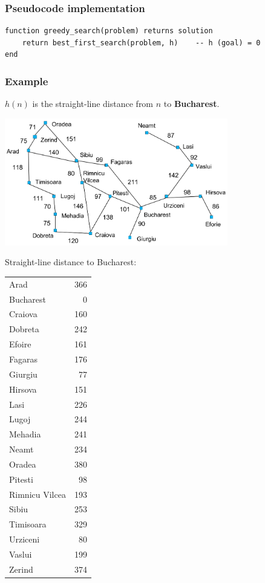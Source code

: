 \documentclass[11pt]{article}
\begin{document}
\subsubsection{Pseudocode implementation}
\label{sec:orgeae118a}
\begin{verbatim}
function greedy_search(problem) returns solution
    return best_first_search(problem, h)    -- h (goal) = 0
end
\end{verbatim}
\subsubsection{Example}
\label{sec:org9125c4f}
\(h(n)\) is the straight-line distance from \(n\) to \textbf{Bucharest}.

\begin{center}
\includegraphics[height=15em]{./images/greedy-search-example-diagram.png}
\end{center}

Straight-line distance to Bucharest:
\begin{center}
\begin{tabular}{lr}
Arad & 366\\
Bucharest & 0\\
Craiova & 160\\
Dobreta & 242\\
Efoire & 161\\
Fagaras & 176\\
Giurgiu & 77\\
Hirsova & 151\\
Lasi & 226\\
Lugoj & 244\\
Mehadia & 241\\
Neamt & 234\\
Oradea & 380\\
Pitesti & 98\\
Rimnicu Vilcea & 193\\
Sibiu & 253\\
Timisoara & 329\\
Urziceni & 80\\
Vaslui & 199\\
Zerind & 374\\
\end{tabular}
\end{center}
\end{document}
